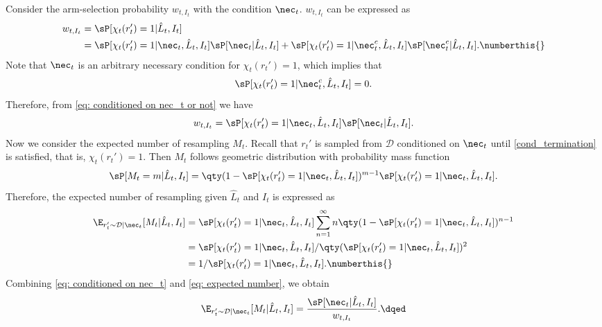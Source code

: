 \begin{proof2}
    Consider the arm-selection probability $w_{t,I_t}$ with the condition $\nec_t$. $w_{t,I_t}$ can be expressed as 
    \begin{align*}
        w_{t,I_t} &= \sP[\chi_t(r_t')=1|\hat{L}_t, I_t] \\
        &= \sP[\chi_t(r_t')=1|\nec_t,\hat{L}_t, I_t]\sP[\nec_t|\hat{L}_t, I_t]+\sP[\chi_t(r_t')=1|\nec_t^c,\hat{L}_t, I_t]\sP[\nec_t^c|\hat{L}_t, I_t]. \numberthis{\label{eq: conditioned on nec_t or not}}
    \end{align*}
    Note that $\nec_{t}$ is an arbitrary necessary condition for $\chi_t(r_t')=1$, which implies that
    \begin{equation*}
        \sP[\chi_t(r_t')=1|\nec_t^c,\hat{L}_t, I_t] = 0.
    \end{equation*}
    Therefore, from \eqref{eq: conditioned on nec_t or not} we have 
    \begin{equation}
        w_{t,I_t} = \sP[\chi_t(r_t')=1|\nec_t,\hat{L}_t, I_t]\sP[\nec_t|\hat{L}_t, I_t].
        \label{eq: conditioned on nec_t}
    \end{equation}
    Now we consider the expected number of resampling $M_t$. Recall that $r_t'$ is sampled from $\mathcal{D}$ conditioned on $\nec_t$ until \eqref{cond_termination} is satisfied, that is, $\chi_t(r_t')=1$. Then $M_t$ follows geometric distribution with probability mass function
    \begin{equation*}
        \sP[M_t=m|\hat{L}_t, I_t]=\qty(1-\sP[\chi_t(r_t')=1|\nec_t,\hat{L}_t, I_t])^{m-1}\sP[\chi_t(r_t')=1|\nec_t,\hat{L}_t, I_t].
    \end{equation*}
    Therefore, the expected number of resampling given $\hat{L}_t$ and $I_t$ is expressed as 
    \begin{align*}
        \E_{r_t' \sim \mathcal{D}|\nec_t}[M_t|\hat{L}_t, I_t] 
        &= \sP[\chi_t(r_t')=1|\nec_t,\hat{L}_t, I_t]\sum_{n=1}^{\infty}n\qty(1-\sP[\chi_t(r_t')=1|\nec_t,\hat{L}_t, I_t])^{n-1} \\
        &= \sP[\chi_t(r_t')=1|\nec_t,\hat{L}_t, I_t] /\qty(\sP[\chi_t(r_t')=1|\nec_t,\hat{L}_t, I_t])^2 \\
        &= 1/\sP[\chi_t(r_t')=1|\nec_t,\hat{L}_t, I_t]. \numberthis{\label{eq: expected number}}
    \end{align*}
    Combining \eqref{eq: conditioned on nec_t} and \eqref{eq: expected number}, we obtain
    \begin{align*}
        \E_{r_t' \sim \mathcal{D}|\nec_t}[M_t|\hat{L}_t, I_t]=\frac{\sP[\nec_t|\hat{L}_t, I_t]}{w_{t,I_t}}. \dqed
    \end{align*}
\end{proof2}

